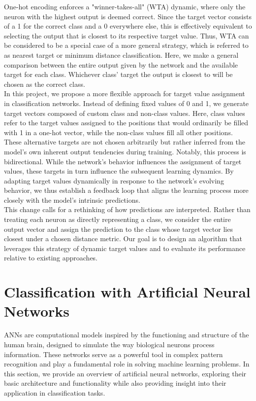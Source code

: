 \documentclass[12pt,fleqn,a4paper]{article}
\begin{document}
One-hot encoding enforces a "winner-takes-all" (WTA) dynamic, where only the neuron with the highest output is deemed correct. Since the target vector consists of a 1 for the correct class and a 0 everywhere else, this is effectively equivalent to selecting the output that is closest to its respective target value. Thus, WTA can be considered to be a special case of a more general strategy, which is referred to as nearest target or minimum distance classification. Here, we make a general comparison between the entire output given by the network and the available target for each class. Whichever class' target the output is closest to will be chosen as the correct class. \\

In this project, we propose a more flexible approach for target value assignment in classification networks. Instead of defining fixed values of 0 and 1, we generate target vectors composed of custom class and non-class values. Here, class values refer to the target values assigned to the positions that would ordinarily be filled with 1 in a one-hot vector, while the non-class values fill all other positions. These alternative targets are not chosen arbitrarily but rather inferred from the model's own inherent output tendencies during training. Notably, this process is bidirectional. While the network's behavior influences the assignment of target values, these targets in turn influence the subsequent learning dynamics. By adapting target values dynamically in response to the network's evolving behavior, we thus establish a feedback loop that aligns the learning process more closely with the model's intrinsic predictions.\\

This change calls for a rethinking of how predictions are interpreted. Rather than treating each neuron as directly representing a class, we consider the entire output vector and assign the prediction to the class whose target vector lies closest under a chosen distance metric. Our goal is to design an algorithm that leverages this strategy of dynamic target values and to evaluate its performance relative to existing approaches. 

\section{Classification with Artificial Neural Networks}\label{sec:class}
ANNs are computational models inspired by the functioning and structure of the human brain, designed to simulate the way biological neurons process information. These networks serve as a powerful tool in complex pattern recognition and play a fundamental role in solving machine learning problems.  In this section, we provide an overview of artificial neural networks, exploring their basic architecture and functionality while also providing insight into their application in classification tasks.
\end{document}
